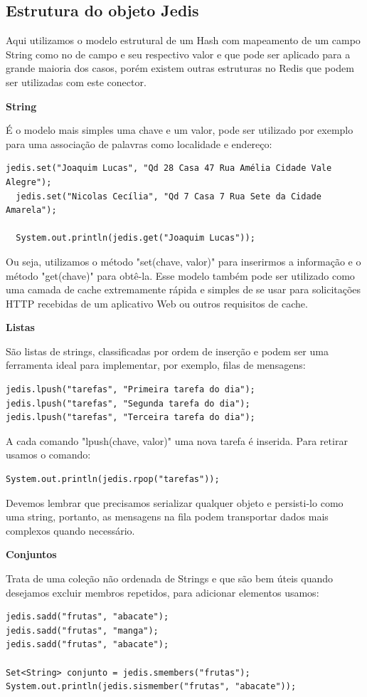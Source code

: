 \subsection{Estrutura do objeto Jedis}
Aqui utilizamos o modelo estrutural de um Hash com mapeamento de um campo String como no de campo e seu respectivo valor e que pode ser aplicado para a grande maioria dos casos, porém existem outras estruturas no Redis que podem ser utilizadas com este conector.

\textbf{String}

É o modelo mais simples uma chave e um valor, pode ser utilizado por exemplo para uma associação de palavras como localidade e endereço:
\begin{lstlisting}[]
  jedis.set("Joaquim Lucas", "Qd 28 Casa 47 Rua Amélia Cidade Vale Alegre");
  jedis.set("Nicolas Cecília", "Qd 7 Casa 7 Rua Sete da Cidade Amarela");
  
  System.out.println(jedis.get("Joaquim Lucas"));
\end{lstlisting}

Ou seja, utilizamos o método "set(chave, valor)" para inserirmos a informação e o método "get(chave)" para obtê-la. Esse modelo também pode ser utilizado como uma camada de cache extremamente rápida e simples de se usar para solicitações HTTP recebidas de um aplicativo Web ou outros requisitos de cache. 

\textbf{Listas}

São listas de strings, classificadas por ordem de inserção e podem ser uma ferramenta ideal para implementar, por exemplo, filas de mensagens:
\begin{lstlisting}[]
jedis.lpush("tarefas", "Primeira tarefa do dia");
jedis.lpush("tarefas", "Segunda tarefa do dia");
jedis.lpush("tarefas", "Terceira tarefa do dia");
\end{lstlisting}

A cada comando "lpush(chave, valor)" uma nova tarefa é inserida. Para retirar usamos o comando:
\begin{lstlisting}[]
System.out.println(jedis.rpop("tarefas"));
\end{lstlisting}

Devemos lembrar que precisamos serializar qualquer objeto e persisti-lo como uma string, portanto, as mensagens na fila podem transportar dados mais complexos quando necessário.

\textbf{Conjuntos}

Trata de uma coleção não ordenada de Strings e que são bem úteis quando desejamos excluir membros repetidos, para adicionar elementos usamos:
\begin{lstlisting}[]
jedis.sadd("frutas", "abacate");
jedis.sadd("frutas", "manga");
jedis.sadd("frutas", "abacate");

Set<String> conjunto = jedis.smembers("frutas");
System.out.println(jedis.sismember("frutas", "abacate"));
\end{lstlisting}

